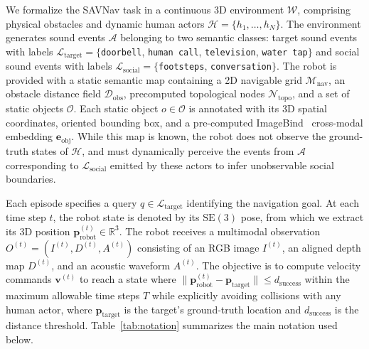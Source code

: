 We formalize the SAVNav task in a continuous 3D environment $\mathcal{W}$, comprising physical obstacles and dynamic human actors $\mathcal{H} = \{h_1, \dots, h_N\}$. The environment generates sound events $\mathcal{A}$ belonging to two semantic classes: target sound events with labels $\mathcal{L}_{\mathrm{target}} = \{$\texttt{doorbell}, \texttt{human call}, \texttt{television}, \texttt{water tap}$\}$ and social sound events with labels $\mathcal{L}_{\mathrm{social}} = \{$\texttt{footsteps}, \texttt{conversation}$\}$. The robot is provided with a static semantic map containing a 2D navigable grid $\mathcal{M}_{\mathrm{nav}}$, an obstacle distance field $\mathcal{D}_{\mathrm{obs}}$, precomputed topological nodes $\mathcal{N}_{\mathrm{topo}}$, and a set of static objects $\mathcal{O}$. Each static object $o \in \mathcal{O}$ is annotated with its 3D spatial coordinates, oriented bounding box, and a pre-computed ImageBind~\cite{ImageBindOneEmbedding2023} cross-modal embedding $\mathbf{e}_{\mathrm{obj}}$. While this map is known, the robot does not observe the ground-truth states of $\mathcal{H}$, and must dynamically perceive the events from $\mathcal{A}$ corresponding to $\mathcal{L}_{\mathrm{social}}$ emitted by these actors to infer unobservable social boundaries.

Each episode specifies a query $q \in \mathcal{L}_{\mathrm{target}}$ identifying the navigation goal. At each time step $t$, the robot state is denoted by its $\mathrm{SE}(3)$ pose, from which we extract its 3D position $\mathbf{p}_{\mathrm{robot}}^{(t)} \in \mathbb{R}^3$. The robot receives a multimodal observation $O^{(t)} = (I^{(t)}, D^{(t)}, A^{(t)})$ consisting of an RGB image $I^{(t)}$, an aligned depth map $D^{(t)}$, and an acoustic waveform $A^{(t)}$. The objective is to compute velocity commands $\mathbf{v}^{(t)}$ to reach a state where $\|\mathbf{p}_{\mathrm{robot}}^{(t)} - \mathbf{p}_{\mathrm{target}}\| \le d_{\mathrm{success}}$ within the maximum allowable time steps $T$ while explicitly avoiding collisions with any human actor, where $\mathbf{p}_{\mathrm{target}}$ is the target's ground-truth location and $d_{\mathrm{success}}$ is the distance threshold. Table~\ref{tab:notation} summarizes the main notation used below.

